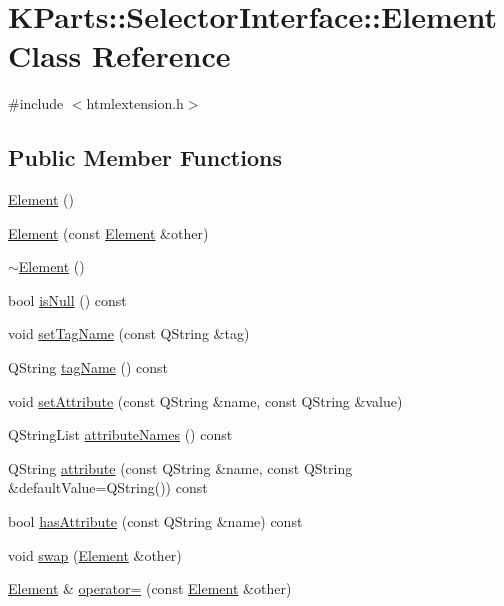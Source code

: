 \hypertarget{classKParts_1_1SelectorInterface_1_1Element}{\section{\-K\-Parts\-:\-:\-Selector\-Interface\-:\-:\-Element \-Class \-Reference}
\label{classKParts_1_1SelectorInterface_1_1Element}
}


{\ttfamily \#include $<$htmlextension.\-h$>$}

\subsection*{\-Public \-Member \-Functions}
\begin{DoxyCompactItemize}
\item 
\hyperlink{classKParts_1_1SelectorInterface_1_1Element_a3438a3a6610070f3f38a93f3794565f7}{\-Element} ()
\item 
\hyperlink{classKParts_1_1SelectorInterface_1_1Element_a68e01b9d6df45aa0847abe82d84d57e2}{\-Element} (const \hyperlink{classKParts_1_1SelectorInterface_1_1Element}{\-Element} \&other)
\item 
\hyperlink{classKParts_1_1SelectorInterface_1_1Element_a2217b551a1f1b1178caa8f9cfb2dd450}{$\sim$\-Element} ()
\item 
bool \hyperlink{classKParts_1_1SelectorInterface_1_1Element_a6d39d0c6e81f1ad38c65eb98f2a7f5f2}{is\-Null} () const 
\item 
void \hyperlink{classKParts_1_1SelectorInterface_1_1Element_a86933031ca5490842cb836fbc8d3e5ed}{set\-Tag\-Name} (const \-Q\-String \&tag)
\item 
\-Q\-String \hyperlink{classKParts_1_1SelectorInterface_1_1Element_a87648c85c363b97ddf75fae2f8c78120}{tag\-Name} () const 
\item 
void \hyperlink{classKParts_1_1SelectorInterface_1_1Element_a55c2e067351500bda7fe4af303f3d441}{set\-Attribute} (const \-Q\-String \&name, const \-Q\-String \&value)
\item 
\-Q\-String\-List \hyperlink{classKParts_1_1SelectorInterface_1_1Element_a3e41322aa68aaeff16e49d606f29efc9}{attribute\-Names} () const 
\item 
\-Q\-String \hyperlink{classKParts_1_1SelectorInterface_1_1Element_a12aa65318e692c7bd967db03117fa6b0}{attribute} (const \-Q\-String \&name, const \-Q\-String \&default\-Value=\-Q\-String()) const 
\item 
bool \hyperlink{classKParts_1_1SelectorInterface_1_1Element_ad3682efe41b9d40511cbe3762cc5127b}{has\-Attribute} (const \-Q\-String \&name) const 
\item 
void \hyperlink{classKParts_1_1SelectorInterface_1_1Element_a99bd201adbe5fd238de6f12900f8b632}{swap} (\hyperlink{classKParts_1_1SelectorInterface_1_1Element}{\-Element} \&other)
\item 
\hyperlink{classKParts_1_1SelectorInterface_1_1Element}{\-Element} \& \hyperlink{classKParts_1_1SelectorInterface_1_1Element_adbc4b50003be9798d2212e3d0c998bd7}{operator=} (const \hyperlink{classKParts_1_1SelectorInterface_1_1Element}{\-Element} \&other)
\end{DoxyCompactItemize}


